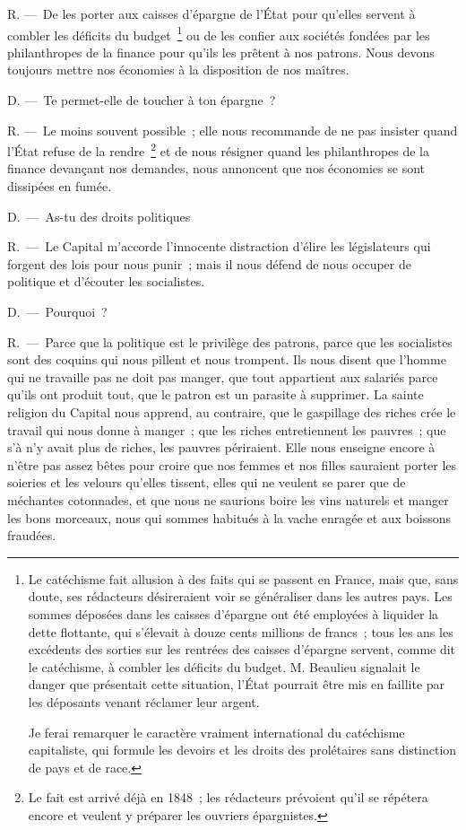 \documentclass[french,twoside]{book} %
\begin{document}
R. — De les porter aux caisses d’épargne de l’État pour qu’elles servent à combler les déficits du budget \footnote{ \noindent Le catéchisme fait allusion à des faits qui se passent en France, mais que, sans doute, ses rédacteurs désireraient voir se généraliser dans les autres pays. Les sommes déposées dans les caisses d’épargne ont été employées à liquider la dette flottante, qui s’élevait à douze cents millions de francs ; tous les ans les excédents des sorties sur les rentrées des caisses d’épargne servent, comme dit le catéchisme, à combler les déficits du budget. M. Beaulieu signalait le danger que présentait cette situation, l’État pourrait être mis en faillite par les déposants venant réclamer leur argent.\par
 Je ferai remarquer le caractère vraiment international du catéchisme capitaliste, qui formule les devoirs et les droits des prolétaires sans distinction de pays et de race.
} ou de les confier aux sociétés fondées par les philanthropes de la finance pour qu’ils les prêtent à nos patrons. Nous devons toujours mettre nos économies à la disposition de nos maîtres.\par
D. — Te permet-elle de toucher à ton épargne ?\par
R. — Le moins souvent possible ; elle nous recommande de ne pas insister quand l’État refuse de la rendre \footnote{Le fait est arrivé déjà en 1848 ; les rédacteurs prévoient qu’il se répétera encore et veulent y préparer les ouvriers épargnistes.} et de nous résigner quand les philanthropes de la finance devançant nos demandes, nous annoncent que nos économies se sont dissipées en fumée.\par
D. — As-tu des droits politiques\par
R. — Le Capital m’accorde l’innocente distraction d’élire les législateurs qui forgent des lois pour nous punir ; mais il nous défend de nous occuper de politique et d’écouter les socialistes.\par
D. — Pourquoi ?\par
R. — Parce que la politique est le privilège des patrons, parce que les socialistes sont des coquins qui nous pillent et nous trompent. Ils nous disent que l’homme qui ne travaille pas ne doit pas manger, que tout appartient aux salariés parce qu’ils ont produit tout, que le patron est un parasite à supprimer. La sainte religion du Capital nous apprend, au contraire, que le gaspillage des riches crée le travail qui nous donne à manger ; que les riches entretiennent les pauvres ; que s’à n’y avait plus de riches, les pauvres périraient. Elle nous enseigne encore à n’être pas assez bêtes pour croire que nos femmes et nos filles sauraient porter les soieries et les velours qu’elles tissent, elles qui ne veulent se parer que de méchantes cotonnades, et que nous ne saurions boire les vins naturels et manger les bons morceaux, nous qui sommes habitués à la vache enragée et aux boissons fraudées.\par
\end{document}
